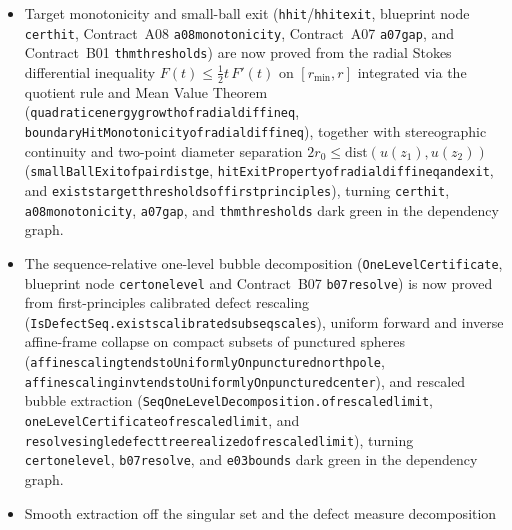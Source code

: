 \documentclass[11pt]{article}
\renewcommand{\_}{\origus\allowbreak}
\newcommand{\code}[1]{\texttt{#1}}
\begin{document}
\begin{itemize}
  step $\mathrm{ContDiffAt}\;\mathbb{R}\;(n+1)\Rightarrow\mathrm{ContDiffAt}\;\mathbb{R}\;(n+2)$ via
  first-principles chart-to-manifold regularity transfer
  (\code{contDiffAt\_writtenInExtChartAt\_of\_contMDiffOn},
  \code{contMDiffWithinAt\_of\_weakJHolomorphicOn\_and\_contDiffAt\_writtenInExtChartAt},
  \code{regularityTowerProperty\_of\_chart\_step},
  \code{nonlinear\_elliptic\_bootstrap\_of\_chart\_step}, and
  \code{removal\_of\_singularities\_of\_slices\_and\_decay\_and\_mfderiv\_and\_chart\_step}),
  turning \code{cert\_tower}, \code{a05\_bootstrap}, and \code{a12\_removal} dark green in the
  dependency graph.
\item Target monotonicity and small-ball exit (\code{h\_hit}/\code{h\_hit\_exit}, blueprint node
  \code{cert\_hit}, Contract~A08 \code{a08\_monotonicity}, Contract~A07 \code{a07\_gap}, and
  Contract~B01 \code{thm\_thresholds}) are now proved from the radial Stokes differential inequality
  $F(t)\le \tfrac12 t\,F'(t)$ on $[r_{\min},r]$ integrated via the quotient rule and Mean Value Theorem
  (\code{quadratic\_energy\_growth\_of\_radial\_diff\_ineq},
  \code{boundaryHitMonotonicity\_of\_radial\_diff\_ineq}), together with stereographic continuity and
  two-point diameter separation $2r_0\le \mathrm{dist}(u(z_1),u(z_2))$
  (\code{smallBallExit\_of\_pair\_dist\_ge},
  \code{hitExitProperty\_of\_radial\_diff\_ineq\_and\_exit}, and
  \code{exists\_target\_thresholds\_of\_first\_principles}), turning \code{cert\_hit},
  \code{a08\_monotonicity}, \code{a07\_gap}, and \code{thm\_thresholds} dark green in the
  dependency graph.
\item The sequence-relative one-level bubble decomposition (\code{OneLevelCertificate}, blueprint
  node \code{cert\_onelevel} and Contract~B07 \code{b07\_resolve}) is now proved from first-principles
  calibrated defect rescaling (\code{IsDefectSeq.exists\_calibrated\_subseq\_scales}), uniform forward
  and inverse affine-frame collapse on compact subsets of punctured spheres
  (\code{affine\_scaling\_tendstoUniformlyOn\_punctured\_north\_pole},
  \code{affine\_scaling\_inv\_tendstoUniformlyOn\_punctured\_center}), and rescaled bubble extraction
  (\code{SeqOneLevelDecomposition.of\_rescaled\_limit},
  \code{oneLevelCertificate\_of\_rescaled\_limit}, and
  \code{resolve\_single\_defect\_tree\_realized\_of\_rescaled\_limit}), turning
  \code{cert\_onelevel}, \code{b07\_resolve}, and \code{e03\_bounds} dark green in the dependency
  graph.
\item Smooth extraction off the singular set and the defect measure decomposition

\end{itemize}
\end{document}
